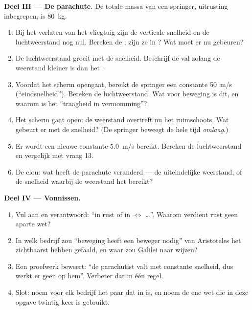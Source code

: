 \begin{problem}
\medskip
\noindent\textbf{Deel III --- De parachute.}
De totale massa van een springer, uitrusting inbegrepen, is
\qty{80}{kg}.
\begin{enumerate}[resume]
  \item Bij het verlaten van het vliegtuig zijn de verticale snelheid en
        de luchtweerstand nog nul. Bereken de ; zijn ze in
        ? Wat moet er nu gebeuren?
  \item De luchtweerstand groeit met de snelheid. Beschrijf de val
        zolang de weerstand kleiner is dan het .
  \item Voordat het scherm opengaat, bereikt de springer een constante
        \qty{50}{m/s} (``eindsnelheid''). Bereken de luchtweerstand. Wat
        voor beweging is dit, en waarom is het ``traagheid in
        vermomming''?
  \item Het scherm gaat open: de weerstand overtreft nu het 
        ruimschoots. Wat gebeurt er met de snelheid? (De springer
        beweegt de hele tijd \emph{omlaag}.)
  \item Er wordt een nieuwe constante \qty{5.0}{m/s} bereikt. Bereken de
        luchtweerstand en vergelijk met vraag 13.
  \item De clou: wat heeft de parachute veranderd --- de uiteindelijke
        weerstand, of de snelheid waarbij de weerstand het 
        bereikt?
\end{enumerate}

\medskip
\noindent\textbf{Deel IV --- Vonnissen.}
\begin{enumerate}[resume]
  \item Vul aan en verantwoord: ``in rust of in  $\iff$ \dots''. Waarom verdient rust geen aparte wet?
  \item In welk bedrijf zou ``beweging heeft een beweger nodig'' van
        Aristoteles het zichtbaarst hebben gefaald, en waar zou Galilei
        naar wijzen?
  \item Een proefwerk beweert: ``de parachutist valt met constante
        snelheid, dus werkt er geen  op hem''. Verbeter dat in één
        regel.
  \item Slot: noem voor elk bedrijf het paar  dat in 
        is, en noem de ene wet die in deze opgave twintig keer is
        gebruikt.
\end{enumerate}
\end{problem}
